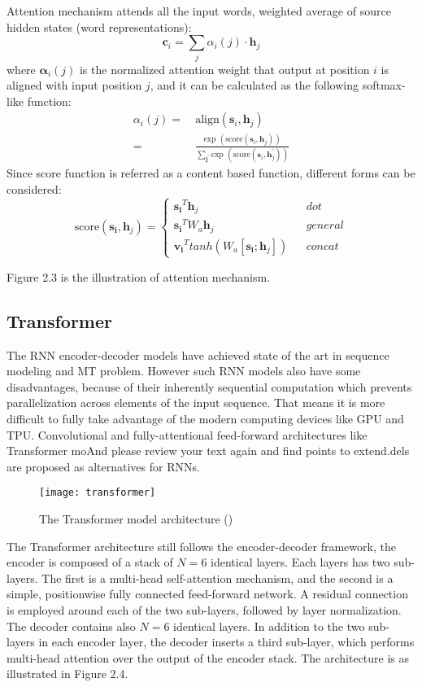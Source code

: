 Attention mechanism attends all the input words, weighted average of source hidden states (word representations):
\[ \bm{c}_i = \sum_{j} {\alpha}_i(j)\cdot  \bm{h}_j \]
where $\bm{\alpha}_i(j)$ is the normalized attention weight that output at position $i$ is aligned with input position $j$, and it can be calculated as the following softmax-like function:
\begin{align}
{\alpha}_i(j) = & \ \text{align}(\bm{s}_i, {\bm{h}}_j) \\
= & \ \frac{\text{exp\ }(\text{score}(\bm{s}_i, {\bm{h}}_j))}{\sum_{\bm{j}^{\prime}} \text{exp\ }(\text{score}(\bm{s}_i, {\bm{h}}_j^{\prime}))}
\end{align}
Since score function is referred as a content based function, different forms can be considered:
\begin{equation}
\text{score}(\bm{s_i}, {\bm{h}}_j)=\left\{
\begin{array}{lcl}
{\bm{s_i}}^T {\bm{h}}_j & & dot\\
{\bm{s_i}}^T W_a {\bm{h}}_j & & general\\
{\bm{v_i}}^T tanh(W_a[\bm{s_i}; {\bm{h}}_j]) & & concat
\end{array} \right.
\end{equation}


Figure 2.3 is the illustration of attention mechanism.


\subsection{Transformer}

The RNN encoder-decoder models have achieved state of the art in sequence modeling and MT problem. However such RNN models also have some disadvantages, because of their inherently sequential computation which prevents parallelization across elements of the input sequence. That means it is more difficult to fully take advantage of the modern computing devices like GPU and TPU. Convolutional \cite{gehring2017convolutional} and fully-attentional feed-forward architectures like Transformer \cite{vaswani2017attention} moAnd please review your text again and find points to extend.dels are proposed as alternatives for RNNs. \\

\begin{figure}[t]
	\centering
	\texttt{[image: transformer]}
	\caption{The Transformer model architecture (\cite{vaswani2017attention})}
\end{figure}
The Transformer architecture still follows the encoder-decoder framework, the encoder is composed of a stack of $N=6$ identical layers. Each layers has two sub-layers. The first is a multi-head self-attention mechanism, and the second is a simple, positionwise fully connected feed-forward network. A residual connection is employed around each of the two sub-layers, followed by layer normalization. The decoder contains also $N=6$ identical layers. In addition to the two sub-layers in each encoder layer, the decoder inserts a third sub-layer, which performs multi-head attention over the output of the encoder stack. The architecture is as illustrated in Figure 2.4.\\

